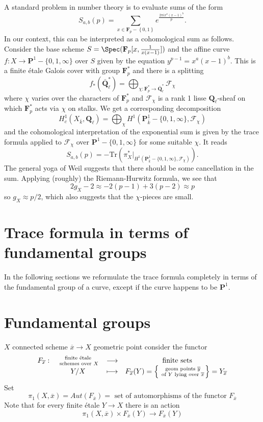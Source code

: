 \noindent
A standard problem in number theory is to evaluate sums of the form
$$
S_{a, b}(p) = \sum_{x\in \mathbf{F}_p-\left\{0, 1\right\}} e^{\frac{2\pi
ix^a(x-1)^b}{p}}.
$$
In our context, this can be interpreted as a cohomological sum as follows.
Consider the base scheme
$S = \Spec(\mathbf{F}_p[x, \frac{1}{x(x-1)}])$ and the affine curve
$f: X \to \mathbf{P}^1-\{0, 1, \infty\}$ over $S$ given by the equation
$y^{p-1} = x^a(x-1)^b$. This is a finite \'etale Galois cover with group
$\mathbf{F}_p^*$ and there is a splitting
$$
f_*(\bar{\mathbf{Q}}_\ell^*) =
\bigoplus_{\chi : \mathbf{F}_p^*\to \bar{\mathbf{Q}}_\ell^*} \mathcal{F}_\chi
$$
where $\chi$ varies over the characters of $\mathbf{F}_p^*$ and
$\mathcal{F}_\chi$ is a rank 1 lisse $\mathbf{Q}_\ell$-sheaf on which
$\mathbf{F}_p^*$ acts via $\chi$ on stalks. We get a corresponding decomposition
$$
H_c^1(X_{\bar k}, \mathbf{Q}_\ell) = \bigoplus_\chi H^1(\mathbf{P}_{\bar
k}^1-\{0, 1, \infty\}, \mathcal{F}_\chi)
$$
and the cohomological interpretation of the exponential sum is given by the
trace formula applied to $\mathcal{F}_\chi$ over $\mathbf{P}^1 - \{0, 1,
\infty\}$ for some suitable $\chi$. It reads
$$
S_{a, b}(p) = -\text{Tr}\left(\pi_X^*\big|_{H^1(\mathbf{P}_{\bar k}^1-\{0, 1,
\infty\}, \mathcal{F}_\chi)}\right).
$$
The general yoga of Weil suggests that there should be some cancellation in the
sum. Applying (roughly) the Riemann-Hurwitz formula, we see that
$$
2g_X-2 \approx -2 (p-1) + 3(p-2) \approx p
$$
so $g_X\approx p/2$, which also suggests that the $\chi$-pieces are small.



\section{Trace formula in terms of fundamental groups}
\label{section-trace-formual-fundamental-group}

\noindent
In the following sections we reformulate the trace formula completely
in terms of the fundamental group of a curve, except if the curve
happens to be $\mathbf{P}^1$.




\section{Fundamental groups}
\label{section-fundamental-groups}

\noindent
$X$ connected scheme $\overline x\to X$ geometric
point consider the functor
$$
\begin{matrix}
F_{\overline x}: &
\text{ finite \'etale }\atop \text{ schemes over } X &
\longrightarrow & \text{ finite sets} \\
&
Y/X &
\longmapsto &
F_{\overline x}(Y) =
\left\{\text{ geom points }\overline y\atop \text{ of } Y
\text{ lying over }\overline x\right\} = Y_{\overline x}
\end{matrix}
$$
Set
$$
\pi_1(X, \overline x)
=
Aut(F_{\overline x})
=
\text{ set of automorphisms of the functor }F_{\overline x}
$$
Note that for every finite \'etale $Y \to X$ there is an action
$$
\pi_1(X, \overline x) \times F_{\overline x}(Y) \to F_{\overline x}(Y)
$$

